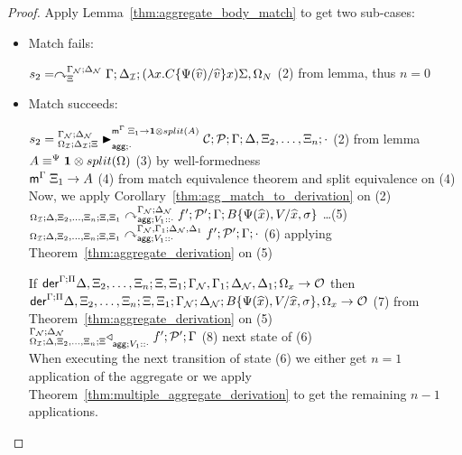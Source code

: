 \begin{proof}
Apply Lemma~\ref{thm:aggregate_body_match} to get two sub-cases:
   
\begin{itemize}[leftmargin=*]
   \item Match fails:
   
   $s_2 = \derstatex{\Gamma}{\deltan}{\Xi}{\gammanew}{\deltanew}
{(\lambda x.  C\{\Psi(\widehat{v})/\widehat{v}\} x) \Sigma,
   \Omega_N}$ \hfill (2) from lemma, thus $n = 0$\\
   
   \item Match succeeds:


      $s_2 = \matstatea{\deltan}{\lstack{C}; \lstack{P}}{\Gamma}
         {\Delta, \Xi_2, \dotsc, \Xi_n}{\cdot}{\Xi_1 \rightarrow \one \otimes
                                                 split(A)}{\cdot}$ \hfill (2) from
                                lemma \\
     $\feqa{A}{\one \otimes split(\Omega)}{\Psi}{\Psi}$ \hfill (3) by well-formedness \\
      $\mz{\Gamma}{\Xi_1}{A}$ \hfill (4) from match equivalence
      theorem and split equivalence on (4) \\

      Now, we apply Corollary~\ref{thm:agg_match_to_derivation} on (2) \\

      $\derstatea{\Delta, \Xi_2, \dotsc, \Xi_n}{\Xi,
         \Xi_1}{\gammanew}{\deltanew}{V_1 :: \cdot}{f';
            \lstack{P'}}{B\{\Psi(\widehat{x}), V / \widehat{x}, \sigma\}}$
      \dots \hfill (5) \\

      $\derstatea{\Delta, \Xi_2, \dotsc, \Xi_n}{\Xi, \Xi_1}{\gammanew,
         \Gamma_1}{\deltanew, \Delta_1}{V_1 :: \cdot}{f'; \lstack{P'}}{\cdot}$
      \hfill (6) applying Theorem~\ref{thm:aggregate_derivation} on (5)

      If $\dz{\Gamma}{\Pi}{\Delta, \Xi_2, \dotsc, \Xi_n}{\Xi, \Xi_1}{\gammanew,
         \Gamma_1}{\deltanew, \Delta_1}{\Omega_x}{\outsem}$ then \\
         \hspace{2cm}
         $\dz{\Gamma}{\Pi}{\Delta, \Xi_2, \dotsc,
            \Xi_n}{\Xi, \Xi_1}{\gammanew}{\deltanew}{B\{\Psi(\widehat{x}), V
               / \widehat{x}, \sigma\}, \Omega_x}{\outsem}$
            \hfill (7) from
      Theorem~\ref{thm:aggregate_derivation} on (5) \\


      $\contstatea{\Delta, \Xi_2, \dotsc, \Xi_n}{f' ; \lstack{P'}}{\Gamma}{V_1
         :: \cdot}$ \hfill (8) next state of (6) \\

   
   When executing the next transition of state (6) we either get $n = 1$
   application of the aggregate or we apply
   Theorem~\ref{thm:multiple_aggregate_derivation} to get the remaining $n-1$
   applications.
\end{itemize}
\end{proof}
